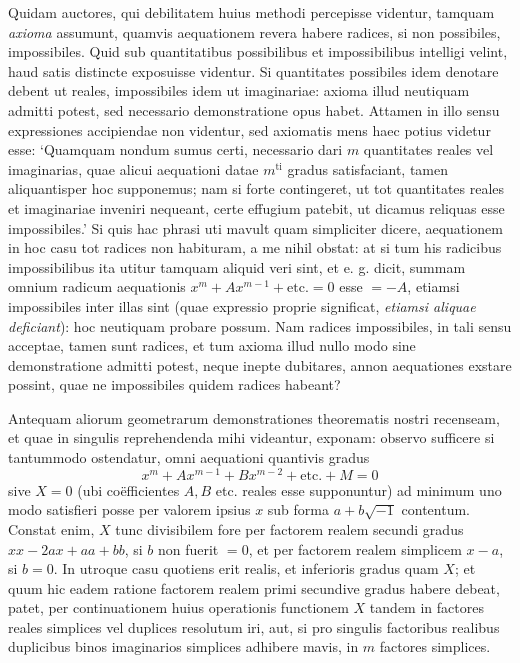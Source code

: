 Quidam auctores, qui debilitatem huius methodi percepisse videntur, tamquam \textit{axioma} assumunt, quamvis aequationem revera habere radices, si non possibiles, impossibiles. Quid sub quantitatibus possibilibus et impossibilibus intelligi velint, haud satis distincte exposuisse videntur. Si quantitates possibiles
idem denotare debent ut reales, impossibiles idem ut imaginariae: axioma illud
neutiquam admitti potest, sed necessario demonstratione opus habet. Attamen
in illo sensu expressiones accipiendae non videntur, sed axiomatis mens haec potius videtur esse: `Quamquam nondum sumus certi, necessario dari $m$ quantitates reales vel imaginarias, quae alicui aequationi datae $m^{\mathrm{ti}}$ gradus satisfaciant,
tamen aliquantisper hoc supponemus; nam si forte contingeret, ut tot quantitates reales et imaginariae inveniri nequeant, certe effugium patebit, ut dicamus
reliquas esse impossibiles.' Si quis hac phrasi uti mavult quam simpliciter dicere, aequationem in hoc casu tot radices non habituram, a me nihil obstat: at
si tum his radicibus impossibilibus ita utitur tamquam aliquid veri sint, et e. g.
dicit, summam omnium radicum aequationis $x^m+Ax^{m-1}+\text{etc.}=0$ esse
$=-A$, etiamsi impossibiles inter illas sint (quae expressio proprie significat,
\textit{etiamsi aliquae deficiant}): hoc neutiquam probare possum. Nam radices impossibiles, in tali sensu acceptae, tamen sunt radices, et tum axioma illud nullo modo
sine demonstratione admitti potest, neque inepte dubitares, annon aequationes
exstare possint, quae ne impossibiles quidem radices habeant?

Antequam aliorum geometrarum demonstrationes theorematis nostri recenseam, et quae in singulis reprehendenda mihi videantur, exponam: observo sufficere si tantummodo ostendatur, omni aequationi quantivis gradus
\[
x^m+Ax^{m-1}+Bx^{m-2}+\text{etc.}+M=0
\]
sive $X=0$ (ubi coëfficientes $A,B$ etc. reales esse supponuntur) ad minimum
uno modo satisfieri posse per valorem ipsius $x$ sub forma $a+b\sqrt{-1}$ contentum. Constat enim, $X$ tunc divisibilem fore per factorem realem secundi gradus
$xx-2ax+aa+bb$, si $b$ non fuerit $=0$, et per factorem realem simplicem
$x-a$, si $b=0$. In utroque casu quotiens erit realis, et inferioris gradus quam
$X$; et quum hic eadem ratione factorem realem primi secundive gradus habere debeat, patet, per continuationem huius operationis functionem $X$ tandem in factores reales simplices vel duplices resolutum iri, aut, si pro singulis factoribus
realibus duplicibus binos imaginarios simplices adhibere mavis, in $m$ factores
simplices.

